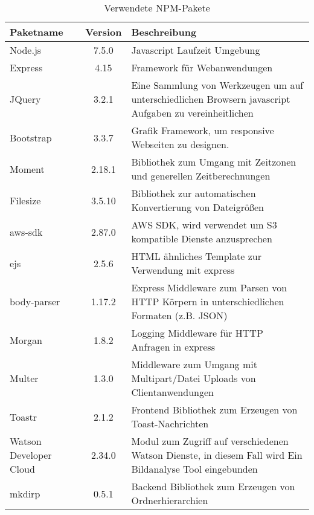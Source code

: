 \begin{table}
	\centering
		\begin{tabular}{ l | c | p{8cm}}
			\hline
			Paketname & Version & Beschreibung \\ \hline
			Node.js & 7.5.0 & Javascript Laufzeit Umgebung \\
			Express & 4.15 & Framework für Webanwendungen \\
			JQuery & 3.2.1 & Eine Sammlung von Werkzeugen um auf unterschiedlichen Browsern javascript Aufgaben zu vereinheitlichen \\
			Bootstrap & 3.3.7 & Grafik Framework, um responsive Webseiten zu designen. \\
			Moment & 2.18.1 & Bibliothek zum Umgang mit Zeitzonen und generellen Zeitberechnungen \\
			Filesize & 3.5.10 & Bibliothek zur automatischen Konvertierung von Dateigrößen \\
			aws-sdk & 2.87.0 & AWS SDK, wird verwendet um S3 kompatible Dienste anzusprechen \\
			ejs & 2.5.6 & HTML ähnliches Template zur Verwendung mit express \\
			body-parser & 1.17.2 & Express Middleware zum Parsen von HTTP Körpern in unterschiedlichen Formaten (z.B. JSON)\\
			Morgan & 1.8.2 & Logging Middleware für HTTP Anfragen in express \\
			Multer & 1.3.0 & Middleware zum Umgang mit Multipart/Datei Uploads von Clientanwendungen \\
			Toastr & 2.1.2 & Frontend Bibliothek zum Erzeugen von Toast-Nachrichten \\
			Watson Developer Cloud & 2.34.0 & Modul zum Zugriff auf verschiedenen Watson Dienste, in diesem Fall wird Ein Bildanalyse Tool eingebunden \\
			mkdirp & 0.5.1 & Backend Bibliothek zum Erzeugen von Ordnerhierarchien
		\end{tabular}
		\caption{Verwendete NPM-Pakete}
		\label{tab:npmpackages}
\end{table}
